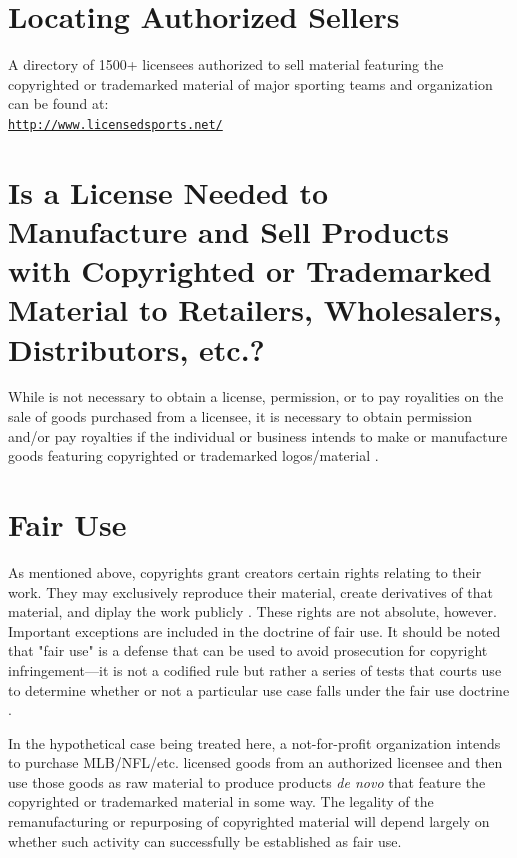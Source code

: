 \documentclass[letterpaper,11pt]{texMemo}
\begin{document}
\section*{Locating Authorized Sellers}
	A directory of 1500+ licensees authorized to sell material featuring the copyrighted or trademarked material of major sporting teams and organization can be found at:\\
  \texttt{\href{http://www.licensedsports.net/}{http://www.licensedsports.net/}}

\section*{Is a License Needed to Manufacture and Sell Products with Copyrighted or Trademarked Material to Retailers, Wholesalers, Distributors, etc.?}
  While is not necessary to obtain a license, permission, or to pay royalities on the sale of goods purchased from a licensee, it is necessary to obtain permission and/or pay royalties if the individual or business intends to make or manufacture goods featuring copyrighted or trademarked logos/material \cite{licensedsports}.

\section*{Fair Use}
  As mentioned above, copyrights grant creators certain rights relating to their work. They may exclusively reproduce their material, create derivatives of that material, and diplay the work publicly \cite{17usc106}. These rights are not absolute, however. Important exceptions are included in the doctrine of fair use. It should be noted that "fair use" is a defense that can be used to avoid prosecution for copyright infringement—it is not a codified rule but rather a series of tests that courts use to determine whether or not a particular use case falls under the fair use doctrine \cite{saracino}.

  In the hypothetical case being treated here, a not-for-profit organization intends to purchase MLB/NFL/etc. licensed goods from an authorized licensee and then use those goods as raw material to produce products \emph{de novo} that feature the copyrighted or trademarked material in some way. The legality of the remanufacturing or repurposing of copyrighted material will depend largely on whether such activity can successfully be established as fair use.
\end{document}
